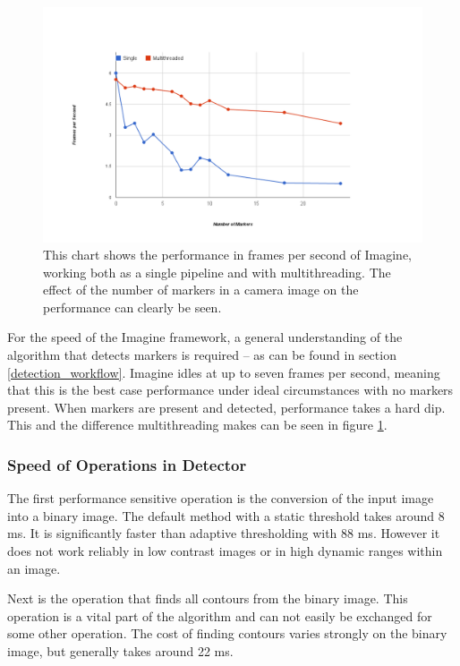 \begin{figure}
	\centering
	\includegraphics[width=14cm]{img/performance_chart.png}
	\caption[Imagine Performance Chart.]{This chart shows the performance in frames per second of Imagine, working both as a single pipeline and with multithreading. The effect of the number of markers in a camera image on the performance can clearly be seen.}
	\label{fig:performance_chart}
\end{figure}

For the speed of the Imagine framework, a general understanding of the algorithm that detects markers is required – as can be found in section \ref{detection_workflow}.
Imagine idles at up to seven frames per second, meaning that this is the best case performance under ideal circumstances with no markers present.
When markers are present and detected, performance takes a hard dip.
This and the difference multithreading makes can be seen in figure \ref{fig:performance_chart}.

\subsubsection{Speed of Operations in Detector}

The first performance sensitive operation is the conversion of the input image into a binary image.
The default method with a static threshold takes around 8 ms.
It is significantly faster than adaptive thresholding with 88 ms.
However it does not work reliably in low contrast images or in high dynamic ranges within an image.

Next is the operation that finds all contours from the binary image.
This operation is a vital part of the algorithm and can not easily be exchanged for some other operation.
The cost of finding contours varies strongly on the binary image, but generally takes around 22 ms.

